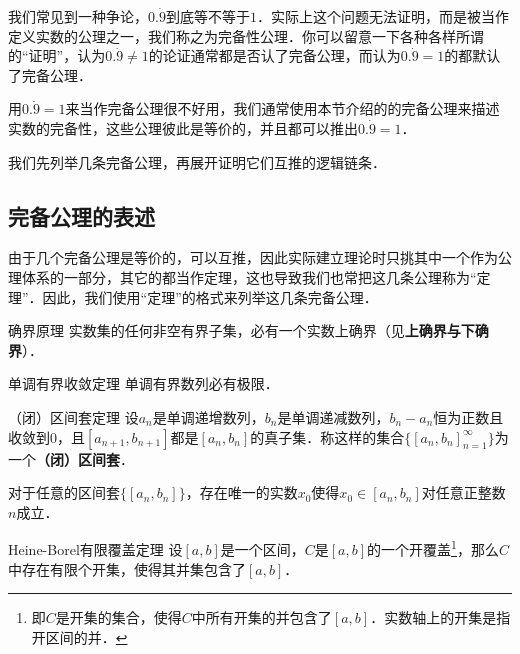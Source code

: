 


我们常见到一种争论，$0.\dot{9}$到底等不等于$1$．实际上这个问题无法证明，而是被当作定义实数的公理之一，我们称之为完备性公理．你可以留意一下各种各样所谓的“证明”，认为$0.\dot{9}\neq 1$的论证通常都是否认了完备公理，而认为$0.\dot{9}=1$的都默认了完备公理．

用$0.\dot{9}=1$来当作完备公理很不好用，我们通常使用本节介绍的的完备公理来描述实数的完备性，这些公理彼此是等价的，并且都可以推出$0.\dot{9}=1$．

我们先列举几条完备公理，再展开证明它们互推的逻辑链条．

\subsection{完备公理的表述}

由于几个完备公理是等价的，可以互推，因此实际建立理论时只挑其中一个作为公理体系的一部分，其它的都当作定理，这也导致我们也常把这几条公理称为“定理”．因此，我们使用“定理”的格式来列举这几条完备公理．

\begin{theorem}{确界原理}\label{RCompl_the1}
实数集的任何非空有界子集，必有一个实数上确界（见\textbf{上确界与下确界}）．
\end{theorem}

\begin{theorem}{单调有界收敛定理}\label{RCompl_the2}
单调有界数列必有极限．
\end{theorem}

\begin{theorem}{（闭）区间套定理}\label{RCompl_the3}
设$a_n$是单调递增数列，$b_n$是单调递减数列，$b_n-a_n$恒为正数且收敛到$0$，且$[a_{n+1}, b_{n+1}]$都是$[a_n, b_n]$的真子集．称这样的集合$\{[a_n, b_n]_{n=1}^\infty\}$为一个\textbf{（闭）区间套}．

对于任意的区间套$\{[a_n, b_n]\}$，存在唯一的实数$x_0$使得$x_0\in [a_n, b_n]$对任意正整数$n$成立．
\end{theorem}

\begin{theorem}{Heine-Borel有限覆盖定理}\label{RCompl_the4}
设$[a, b]$是一个区间，$C$是$[a, b]$的一个开覆盖\footnote{即$C$是开集的集合，使得$C$中所有开集的并包含了$[a, b]$．实数轴上的开集是指开区间的并．}，那么$C$中存在有限个开集，使得其并集包含了$[a, b]$．
\end{theorem}

